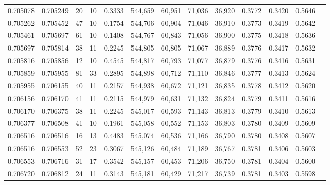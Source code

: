 \begin{tabular}{rrrrrrrrrrrrr}
0.705078 & 0.705249 &    20 &  10 &                                     0.3333 & 544,659 &  60,951 &  71,036 &  36,920 & 0.3772 & 0.3420 & 0.5646 \\
0.705262 & 0.705452 &    47 &  10 &                                     0.1754 & 544,706 &  60,904 &  71,046 &  36,910 & 0.3773 & 0.3419 & 0.5642 \\
0.705461 & 0.705697 &    61 &  10 &                                     0.1408 & 544,767 &  60,843 &  71,056 &  36,900 & 0.3775 & 0.3418 & 0.5636 \\
0.705697 & 0.705814 &    38 &  11 &                                     0.2245 & 544,805 &  60,805 &  71,067 &  36,889 & 0.3776 & 0.3417 & 0.5632 \\
0.705816 & 0.705856 &    12 &  10 &                                     0.4545 & 544,817 &  60,793 &  71,077 &  36,879 & 0.3776 & 0.3416 & 0.5631 \\
0.705859 & 0.705955 &    81 &  33 &                                     0.2895 & 544,898 &  60,712 &  71,110 &  36,846 & 0.3777 & 0.3413 & 0.5624 \\
0.705955 & 0.706155 &    40 &  11 &                                     0.2157 & 544,938 &  60,672 &  71,121 &  36,835 & 0.3778 & 0.3412 & 0.5620 \\
0.706156 & 0.706170 &    41 &  11 &                                     0.2115 & 544,979 &  60,631 &  71,132 &  36,824 & 0.3779 & 0.3411 & 0.5616 \\
0.706170 & 0.706375 &    38 &  11 &                                     0.2245 & 545,017 &  60,593 &  71,143 &  36,813 & 0.3779 & 0.3410 & 0.5613 \\
0.706377 & 0.706508 &    41 &  10 &                                     0.1961 & 545,058 &  60,552 &  71,153 &  36,803 & 0.3780 & 0.3409 & 0.5609 \\
0.706516 & 0.706516 &    16 &  13 &                                     0.4483 & 545,074 &  60,536 &  71,166 &  36,790 & 0.3780 & 0.3408 & 0.5607 \\
0.706516 & 0.706553 &    52 &  23 &                                     0.3067 & 545,126 &  60,484 &  71,189 &  36,767 & 0.3781 & 0.3406 & 0.5603 \\
0.706553 & 0.706716 &    31 &  17 &                                     0.3542 & 545,157 &  60,453 &  71,206 &  36,750 & 0.3781 & 0.3404 & 0.5600 \\
0.706720 & 0.706812 &    24 &  11 &                                     0.3143 & 545,181 &  60,429 &  71,217 &  36,739 & 0.3781 & 0.3403 & 0.5598 \\

\end{tabular}
